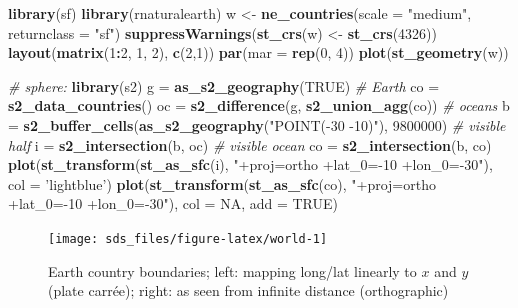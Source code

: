 \documentclass[]{book}
\newenvironment{Shaded}{\begin{snugshade}}{\end{snugshade}}
\newcommand{\CommentTok}[1]{\textcolor[rgb]{0.56,0.35,0.01}{\textit{#1}}}
\newcommand{\DataTypeTok}[1]{\textcolor[rgb]{0.13,0.29,0.53}{#1}}
\newcommand{\DecValTok}[1]{\textcolor[rgb]{0.00,0.00,0.81}{#1}}
\newcommand{\KeywordTok}[1]{\textcolor[rgb]{0.13,0.29,0.53}{\textbf{#1}}}
\newcommand{\NormalTok}[1]{#1}
\newcommand{\OperatorTok}[1]{\textcolor[rgb]{0.81,0.36,0.00}{\textbf{#1}}}
\newcommand{\OtherTok}[1]{\textcolor[rgb]{0.56,0.35,0.01}{#1}}
\newcommand{\StringTok}[1]{\textcolor[rgb]{0.31,0.60,0.02}{#1}}
\begin{document}
\begin{Shaded}
\begin{Highlighting}[]
\KeywordTok{library}\NormalTok{(sf)}
\KeywordTok{library}\NormalTok{(rnaturalearth)}
\NormalTok{w <-}\StringTok{ }\KeywordTok{ne_countries}\NormalTok{(}\DataTypeTok{scale =} \StringTok{"medium"}\NormalTok{, }\DataTypeTok{returnclass =} \StringTok{"sf"}\NormalTok{)}
\KeywordTok{suppressWarnings}\NormalTok{(}\KeywordTok{st_crs}\NormalTok{(w) <-}\StringTok{ }\KeywordTok{st_crs}\NormalTok{(}\DecValTok{4326}\NormalTok{))}
\KeywordTok{layout}\NormalTok{(}\KeywordTok{matrix}\NormalTok{(}\DecValTok{1}\OperatorTok{:}\DecValTok{2}\NormalTok{, }\DecValTok{1}\NormalTok{, }\DecValTok{2}\NormalTok{), }\KeywordTok{c}\NormalTok{(}\DecValTok{2}\NormalTok{,}\DecValTok{1}\NormalTok{))}
\KeywordTok{par}\NormalTok{(}\DataTypeTok{mar =} \KeywordTok{rep}\NormalTok{(}\DecValTok{0}\NormalTok{, }\DecValTok{4}\NormalTok{))}
\KeywordTok{plot}\NormalTok{(}\KeywordTok{st_geometry}\NormalTok{(w))}

\CommentTok{# sphere:}
\KeywordTok{library}\NormalTok{(s2)}
\NormalTok{g =}\StringTok{ }\KeywordTok{as_s2_geography}\NormalTok{(}\OtherTok{TRUE}\NormalTok{) }\CommentTok{# Earth}
\NormalTok{co =}\StringTok{ }\KeywordTok{s2_data_countries}\NormalTok{()}
\NormalTok{oc =}\StringTok{ }\KeywordTok{s2_difference}\NormalTok{(g, }\KeywordTok{s2_union_agg}\NormalTok{(co)) }\CommentTok{# oceans}
\NormalTok{b =}\StringTok{ }\KeywordTok{s2_buffer_cells}\NormalTok{(}\KeywordTok{as_s2_geography}\NormalTok{(}\StringTok{"POINT(-30 -10)"}\NormalTok{), }\DecValTok{9800000}\NormalTok{) }\CommentTok{# visible half}
\NormalTok{i =}\StringTok{ }\KeywordTok{s2_intersection}\NormalTok{(b, oc) }\CommentTok{# visible ocean}
\NormalTok{co =}\StringTok{ }\KeywordTok{s2_intersection}\NormalTok{(b, co)}
\KeywordTok{plot}\NormalTok{(}\KeywordTok{st_transform}\NormalTok{(}\KeywordTok{st_as_sfc}\NormalTok{(i), }\StringTok{"+proj=ortho +lat_0=-10 +lon_0=-30"}\NormalTok{), }\DataTypeTok{col =} \StringTok{'lightblue'}\NormalTok{)}
\KeywordTok{plot}\NormalTok{(}\KeywordTok{st_transform}\NormalTok{(}\KeywordTok{st_as_sfc}\NormalTok{(co), }\StringTok{"+proj=ortho +lat_0=-10 +lon_0=-30"}\NormalTok{), }\DataTypeTok{col =} \OtherTok{NA}\NormalTok{, }\DataTypeTok{add =} \OtherTok{TRUE}\NormalTok{)}
\end{Highlighting}
\end{Shaded}

\begin{figure}

{\centering \texttt{[image: sds\_files/figure-latex/world-1]} 

}

\caption{Earth country boundaries; left: mapping long/lat linearly to \(x\) and \(y\) (plate carrée); right: as seen from infinite distance (orthographic)}\label{fig:world}
\end{figure}
\end{document}
